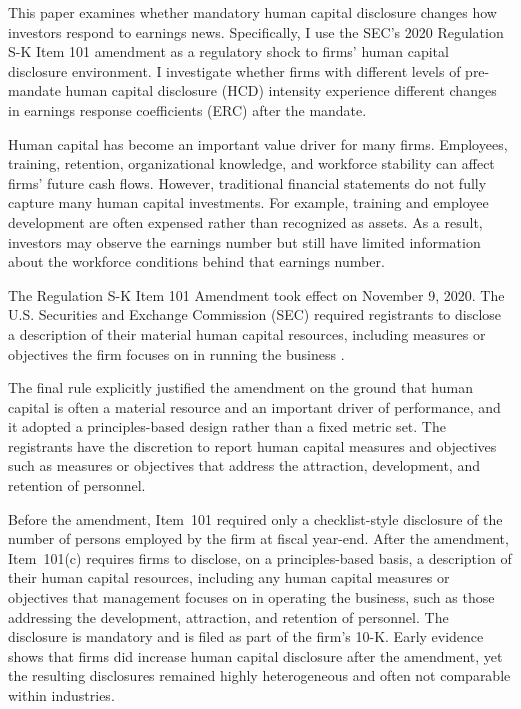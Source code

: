 \documentclass[12pt]{article}
\begin{document}
This paper examines whether mandatory human capital disclosure changes how investors respond to earnings news. Specifically, I use the SEC's 2020 Regulation S-K Item 101 amendment as a regulatory shock to firms' human capital disclosure environment. I investigate whether firms with different levels of pre-mandate human capital disclosure (HCD) intensity experience different changes in earnings response coefficients (ERC) after the mandate.

Human capital has become an important value driver for many firms. Employees, training, retention, organizational knowledge, and workforce stability can affect firms' future cash flows. However, traditional financial statements do not fully capture many human capital investments. For example, training and employee development are often expensed rather than recognized as assets. As a result, investors may observe the earnings number but still have limited information about the workforce conditions behind that earnings number.

The Regulation S-K Item 101 Amendment took effect on November 9, 2020. The U.S. Securities and Exchange Commission (SEC) required registrants to disclose a description of their material human capital resources, including measures or objectives the firm focuses on in running the business .

The final rule explicitly justified the amendment on the ground that human capital is often a material resource and an important driver of performance, and it adopted a principles-based design rather than a fixed metric set. The registrants have the discretion to report human capital measures and objectives such as measures or objectives that address the attraction, development, and retention of personnel.




Before the amendment, Item~101 required only a checklist-style disclosure of the number of persons employed by the firm at fiscal year-end. After the amendment, Item~101(c) requires firms to disclose, on a principles-based basis, a description of their human capital resources, including any human capital measures or objectives that management focuses on in operating the business, such as those addressing the development, attraction, and retention of personnel. The disclosure is mandatory and is filed as part of the firm's 10-K. Early evidence shows that firms did increase human capital disclosure \citep{bourveau_al2022} after the amendment, yet the resulting disclosures remained highly heterogeneous and often not comparable within industries. 
\end{document}
